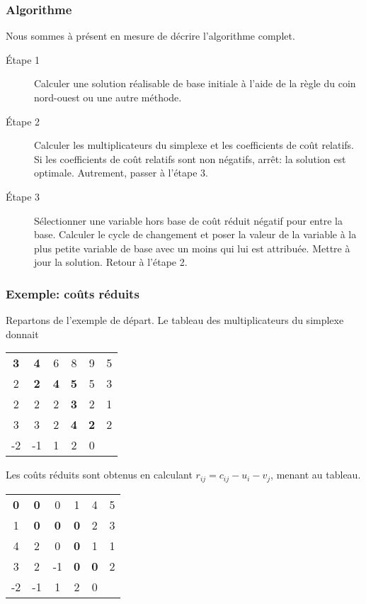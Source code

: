 \documentclass[usepdftitle=false]{beamer}
\begin{document}
\begin{frame}
	\frametitle{Algorithme}
	
Nous sommes à présent en mesure de décrire l'algorithme complet.

\begin{description}
\item[\'Etape 1]
Calculer une solution réalisable de base initiale à l'aide de la règle du coin nord-ouest ou une autre méthode.
\item[\'Etape 2]
Calculer les multiplicateurs du simplexe et les coefficients de coût relatifs.
Si les coefficients de coût relatifs sont non négatifs, arrêt: la solution est optimale. Autrement,
passer à l'étape 3.
\item[\'Etape 3]
Sélectionner une variable hors base de coût réduit négatif pour entre la base.
Calculer le cycle de changement et poser la valeur de la variable à la plus petite variable de base avec un moins qui lui est attribuée.
Mettre à jour la solution. Retour à l'étape 2.
\end{description}

\end{frame}

\begin{frame}
\frametitle{Exemple: coûts réduits}

Repartons de l'exemple de départ. Le tableau des multiplicateurs du simplexe donnait
\begin{center}
	\begin{tabular}{ccccc|c}
		{\bf 3} & {\bf 4} & 6 & 8 & 9 & 5 \\
		2 & {\bf 2} & {\bf 4} & {\bf 5} & 5 & 3 \\
		2 & 2 & 2 & {\bf 3} & 2 & 1 \\
		3 & 3 & 2 & {\bf 4} & {\bf 2} & 2 \\
		\hline
		-2 & -1 & 1 & 2 & 0 & 
	\end{tabular}
\end{center}
Les coûts réduits sont obtenus en calculant $r_{ij} = c_{ij} - u_i - v_j$, menant au tableau.
\begin{center}
	\begin{tabular}{ccccc|c}
		{\bf 0} & {\bf 0} & 0 & 1 & 4 & 5 \\
		1 & {\bf 0} & {\bf 0} & {\bf 0} & 2 & 3 \\
		4 & 2 & 0 & {\bf 0} & 1 & 1 \\
		3 & 2 & -1 & {\bf 0} & {\bf 0} & 2 \\
		\hline
		-2 & -1 & 1 & 2 & 0 & 
	\end{tabular}
\end{center}

\end{frame}
\end{document}

